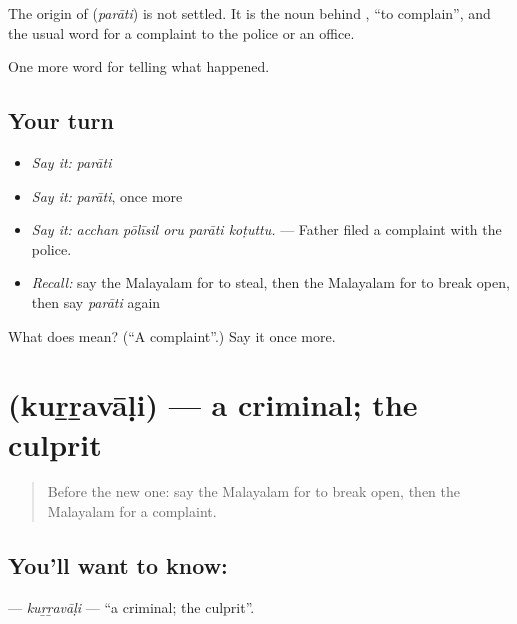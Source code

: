 \begin{cousinweb}
The origin of \textbf{} (\emph{parāti}) is not settled. It is the noun behind , \textquotedblleft{}to complain\textquotedblright{}, and the usual word for a complaint to the police or an office.
\end{cousinweb}

\begin{grammarlens}[title={What you've built}]
One more word for telling what happened.
\end{grammarlens}

\subsection*{Your turn}
\begin{itemize}
\raggedright
  \item \emph{Say it:} \emph{parāti}
  \item \emph{Say it:} \emph{parāti}, once more
  \item \emph{Say it:} \emph{acchan pōlīsil oru parāti koṭuttu.} — Father filed a complaint with the police.
  \item \emph{Recall:} say the Malayalam for to steal, then the Malayalam for to break open, then say \emph{parāti} again
\end{itemize}

\begin{tcolorbox}[breakable,colback=teal!4,colframe=teal!35!black,title={Before you move on}]
What does  mean? (\textquotedblleft{}A complaint\textquotedblright{}.) Say it once more.
\end{tcolorbox}
\section[\texorpdfstring{\ml{കുറ്റവാളി} (kuṟṟavāḷi)}{കുറ്റവാളി (kuṟṟavāḷi)}]{ (kuṟṟavāḷi) — a criminal; the culprit}

\label{lesson:ML-C365-kurravali}



\begin{quote}
Before the new one: say the Malayalam for to break open, then the Malayalam for a complaint.
\end{quote}

\subsection*{You'll want to know: }
\textbf{} — \emph{kuṟṟavāḷi} — \textquotedblleft{}a criminal; the culprit\textquotedblright{}.

